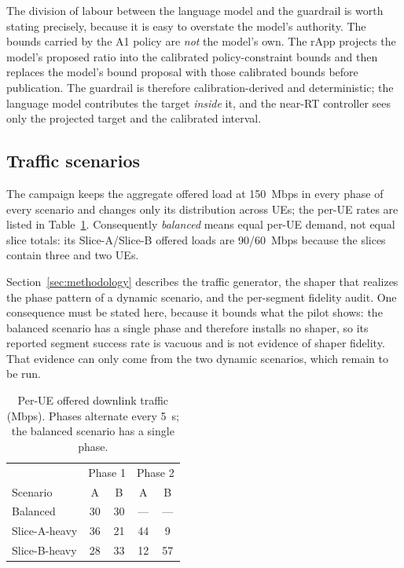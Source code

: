 The division of labour between the language model and the guardrail is worth stating precisely, because it is easy to overstate the model's authority. The bounds carried by the A1 policy are \emph{not} the model's own. The rApp projects the model's proposed ratio into the calibrated policy-constraint bounds and then replaces the model's bound proposal with those calibrated bounds before publication. The guardrail is therefore calibration-derived and deterministic; the language model contributes the target \emph{inside} it, and the near-RT controller sees only the projected target and the calibrated interval.

\subsection{Traffic scenarios}
The campaign keeps the aggregate offered load at 150~Mbps in every phase of every scenario and changes only its distribution across UEs; the per-UE rates are listed in Table~\ref{tab:traffic}. Consequently \emph{balanced} means equal per-UE demand, not equal slice totals: its Slice-A/Slice-B offered loads are 90/60~Mbps because the slices contain three and two UEs.

Section~\ref{sec:methodology} describes the traffic generator, the shaper that realizes the phase pattern of a dynamic scenario, and the per-segment fidelity audit. One consequence must be stated here, because it bounds what the pilot shows: the balanced scenario has a single phase and therefore installs no shaper, so its reported segment success rate is vacuous and is not evidence of shaper fidelity. That evidence can only come from the two dynamic scenarios, which remain to be run.

\begin{table}[t]
\centering
\caption{Per-UE offered downlink traffic (Mbps). Phases alternate every 5~s; the balanced scenario has a single phase.}
\label{tab:traffic}
\begin{tabular}{lcccc}
\toprule
& \multicolumn{2}{c}{Phase 1} & \multicolumn{2}{c}{Phase 2}\\
Scenario & A & B & A & B\\
\midrule
Balanced & 30 & 30 & --- & ---\\
Slice-A-heavy & 36 & 21 & 44 & 9\\
Slice-B-heavy & 28 & 33 & 12 & 57\\
\bottomrule
\end{tabular}
\end{table}
